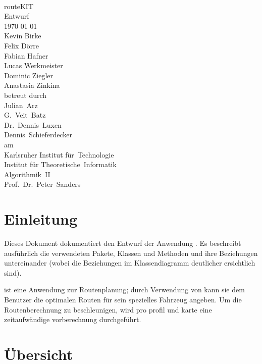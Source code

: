 \documentclass[a4paper, 11pt]{article}
\begin{document}
\begin{titlepage}
\makeatletter
\begin{center}
~\\[5em]
{\Huge routeKIT}\\[3em]
{\huge Entwurf}\\[1em]
{\large\today}\\[2.5em]
{\LARGE
Kevin Birke\\
Felix Dörre\\
Fabian Hafner\\
Lucas Werkmeister\\
Dominic Ziegler\\
Anastasia Zinkina\\[3em]}
betreut durch\\[2em]
{\Large
Julian~Arz\\
G.~Veit~Batz\\
Dr.~Dennis~Luxen\\
Dennis~Schieferdecker\\[1em]}
am\\[1em]
{\Large
Karlsruher Institut für~Technologie\\
Institut für Theoretische~Informatik\\
Algorithmik~II\\
\large
Prof.~Dr.~Peter~Sanders}
\end{center}
\makeatother
\end{titlepage}
\tableofcontents
\newpage


\section{Einleitung}

Dieses Dokument dokumentiert den Entwurf der Anwendung \routeKIT. %
Es beschreibt ausführlich die verwendeten Pakete, Klassen und Methoden und ihre Beziehungen untereinander (wobei die Beziehungen im Klassendiagramm deutlicher ersichtlich sind).

\routeKIT ist eine Anwendung zur Routenplanung; durch Verwendung von  kann sie dem Benutzer die optimalen Routen für sein spezielles Fahrzeug angeben.
Um die Routenberechnung zu beschleunigen, wird pro \gls{profil} und \gls{karte} eine zeitaufwändige \gls{vorberechnung} durchgeführt.


\section{Übersicht}
\end{document}
